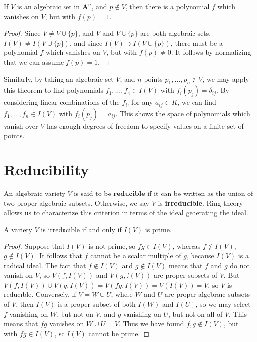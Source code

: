 \begin{corollary}
    If $V$ is an algebraic set in $\mathbf{A}^n$, and $p \not \in V$, then there is a polynomial $f$ which vanishes on $V$, but with $f(p) = 1$.
\end{corollary}
\begin{proof}
    Since $V \neq V \cup \{ p \}$, and $V$ and $V \cup \{ p \}$ are both algebraic sets, $I(V) \neq I(V \cup \{ p \})$, and since $I(V) \supset I(V \cup \{ p \})$, there must be a polynomial $f$ which vanishes on $V$, but with $f(p) \neq 0$. It follows by normalizing that we can assume $f(p) = 1$.
\end{proof}

Similarly, by taking an algebraic set $V$, and $n$ points $p_1, \dots, p_n \not \in V$, we may apply this theorem to find polynomials $f_1, \dots, f_n \in I(V)$ with $f_i(p_j) = \delta_{ij}$. By considering linear combinations of the $f_i$, for any $a_{ij} \in K$, we can find $f_1, \dots, f_n \in I(V)$ with $f_i(p_j) = a_{ij}$. This shows the space of polynomials which vanish over $V$ has enough degrees of freedom to specify values on a finite set of points.

\section{Reducibility}

An algebraic variety $V$ is said to be {\bf reducible} if it can be written as the union of two proper algebraic subsets. Otherwise, we say $V$ is {\bf irreducible}. Ring theory allows us to characterize this criterion in terms of the ideal generating the ideal.

\begin{prop}
    A variety $V$ is irreducible if and only if $I(V)$ is prime.
\end{prop}
\begin{proof}
    Suppose that $I(V)$ is not prime, so $fg \in I(V)$, whereas $f \not \in I(V)$, $g \not \in I(V)$. It follows that $f$ cannot be a scalar multiple of $g$, because $I(V)$ is a radical ideal. The fact that $f \not \in I(V)$ and $g \not \in I(V)$ means that $f$ and $g$ do not vanish on $V$, so $V(f, I(V))$ and $V(g, I(V))$ are proper subsets of $V$. But $V(f, I(V)) \cup V(g, I(V)) = V(fg, I(V)) = V(I(V)) = V$, so $V$ is reducible. Conversely, if $V = W \cup U$, where $W$ and $U$ are proper algebraic subsets of $V$, then $I(V)$ is a proper subset of both $I(W)$ and $I(U)$, so we may select $f$ vanishing on $W$, but not on $V$, and $g$ vanishing on $U$, but not on all of $V$. This means that $fg$ vanishes on $W \cup U = V$. Thus we have found $f,g \not \in I(V)$, but with $fg \in I(V)$, so $I(V)$ cannot be prime.
\end{proof}

